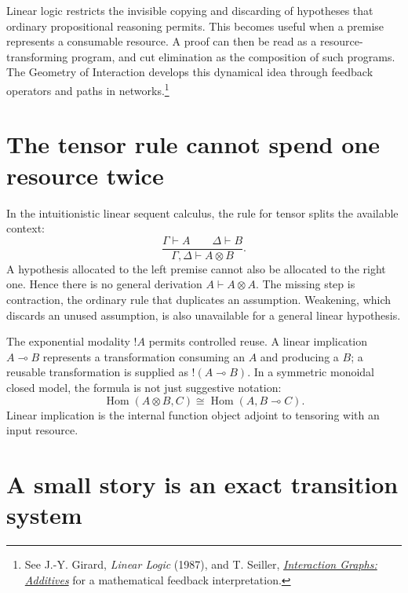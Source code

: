 
Linear logic restricts the invisible copying and discarding of hypotheses that ordinary propositional reasoning permits. This becomes useful when a premise represents a consumable resource. A proof can then be read as a resource-transforming program, and cut elimination as the composition of such programs. The Geometry of Interaction develops this dynamical idea through feedback operators and paths in networks.\footnote{See J.-Y. Girard, \emph{Linear Logic} (1987), and T. Seiller, \href{https://www.ihes.fr/~seiller/documents/articles/IG-Additives.pdf}{\emph{Interaction Graphs: Additives}} for a mathematical feedback interpretation.}

\section{The tensor rule cannot spend one resource twice}

In the intuitionistic linear sequent calculus, the rule for tensor splits the available context:
\[
 \frac{\Gamma\vdash A\qquad\Delta\vdash B}
      {\Gamma,\Delta\vdash A\otimes B}.
\]
A hypothesis allocated to the left premise cannot also be allocated to the right one. Hence there is no general derivation \(A\vdash A\otimes A\). The missing step is contraction, the ordinary rule that duplicates an assumption. Weakening, which discards an unused assumption, is also unavailable for a general linear hypothesis.

The exponential modality \(!A\) permits controlled reuse. A linear implication \(A\multimap B\) represents a transformation consuming an \(A\) and producing a \(B\); a reusable transformation is supplied as \(!(A\multimap B)\). In a symmetric monoidal closed model, the formula is not just suggestive notation:
\[
 \operatorname{Hom}(A\otimes B,C)
 \cong \operatorname{Hom}(A,B\multimap C).
\]
Linear implication is the internal function object adjoint to tensoring with an input resource.

\section{A small story is an exact transition system}

